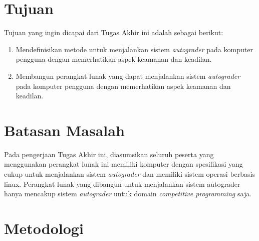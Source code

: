 \section{Tujuan}

\par Tujuan yang ingin dicapai dari Tugas Akhir ini adalah sebagai berikut:
\begin{enumerate}
	\item Mendefinisikan metode untuk menjalankan sistem \textit{autograder} pada komputer pengguna dengan memerhatikan aspek keamanan dan keadilan.
	\item Membangun perangkat lunak yang dapat menjalankan sistem \textit{autograder} pada komputer pengguna dengan memerhatikan aspek keamanan dan keadilan.
\end{enumerate}

\section{Batasan Masalah}

\par Pada pengerjaan Tugas Akhir ini, diasumsikan seluruh peserta yang menggunakan perangkat lunak ini memiliki komputer dengan spesifikasi yang cukup untuk menjalankan sistem \textit{autograder} dan memiliki sistem operasi berbasis linux. Perangkat lunak yang dibangun untuk menjalankan sistem autograder hanya mencakup sistem \textit{autograder} untuk domain \textit{competitive programming} saja.

\section{Metodologi}

